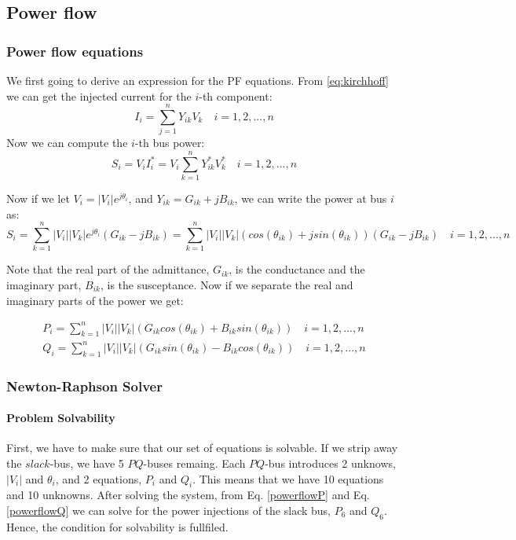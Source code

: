 \documentclass[a4paper,11pt, titlepage, twoside]{article}
\begin{document}
\subsection{Power flow }
\subsubsection{Power flow equations}

We first going to derive an expression for the PF equations.
From \ref{eq:kirchhoff} we can get the injected current for the $i$-th component:
\begin{equation}
    I_i = \sum_{j=1}^{n} Y_{ik}V_k \quad i = 1,2,...,n
\end{equation}
Now we can compute the $i$-th bus power:
\begin{equation}
    S_i = V_iI_i^* = V_i\sum_{k=1}^{n} Y_{ik}^*V_k^* \quad i = 1,2,...,n
\end{equation}

Now if we let $V_i = |V_i|e^{j\theta_i}$, and $Y_{ik} = G_{ik} + jB_{ik}$, we can write the power at bus $i$ as:
\begin{equation}
    S_i = \sum_{k=1}^n|V_i||V_k|e^{j\theta_i}(G_{ik} - jB_{ik}) = \sum_{k=1}^n|V_i||V_k|(cos(\theta_{ik})+jsin(\theta_{ik}))(G_{ik} - jB_{ik}) \quad i = 1,2,...,n
\end{equation}

Note that the real part of the admittance, $G_{ik}$, is the conductance and the imaginary part, $B_{ik}$, is the susceptance. Now if we separate the real and imaginary parts of the power we get:

\begin{align}
    P_i= \sum_{k=1}^n|V_i||V_k|(G_{ik}cos(\theta_{ik}) + B_{ik}sin(\theta_{ik}))\label{powerflowP} \quad i= 1,2,...,n \\
    Q_i= \sum_{k=1}^n|V_i||V_k|(G_{ik}sin(\theta_{ik}) - B_{ik}cos(\theta_{ik}))\label{powerflowQ} \quad i= 1,2,...,n
\end{align}  


\subsubsection{Newton-Raphson Solver}\label{NRsolver}

\paragraph{Problem Solvability}

First, we have to make sure that our set of equations is solvable. If we strip away the $slack$-bus, we have 5 $PQ$-buses remaing. Each $PQ$-bus introduces 2 unknows, $|V_i|$ and $\theta_i$, and 2 equations, $P_i$ and $Q_i$. This means that we have 10 equations and 10 unknowns. 
After solving the system, from  Eq. \ref{powerflowP} and Eq. \ref{powerflowQ} we can solve for the power injections of the slack bus, $P_6$ and $Q_6$. Hence, the condition for solvability is fullfiled.
\end{document}
